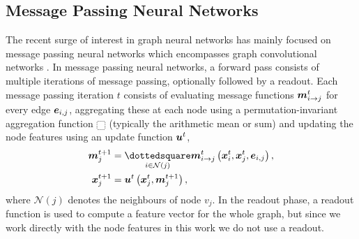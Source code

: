 \documentclass{article}
\begin{document}
\subsection{Message Passing Neural Networks}
The recent surge of interest in graph neural networks has mainly focused on message passing neural networks \citep{Gilmer2017} which encompasses graph convolutional networks \citep{Kipf2016}. In message passing neural networks, a forward pass consists of multiple iterations of message passing, optionally followed by a readout. Each message passing iteration $t$ consists of evaluating message functions ${\bm{m}}^t_{i\to j}$ for every edge ${\bm{e}}_{i,j}$, aggregating these at each node using a permutation-invariant aggregation function $\dottedsquare$ (typically the arithmetic mean or sum) and updating the node features using an update function ${\bm{u}}^t$,
\begin{align}
    \vm^{t+1}_j &= \underset{i\in\mathcal{N}(j)}{\dottedsquare} \vm^t_{i\to j}\left(\vx_i^t, \vx_j^t, \ve_{i,j} \right),\\
    \vx^{t+1}_j &= \vu^t\left(\vx^t_j, \vm^{t+1}_j\right),
\end{align}
where $\mathcal{N}(j)$ denotes the neighbours of node $v_j$. 
In the readout phase, a readout function is used to compute a feature vector for the whole graph, but since we work directly with the node features in this work we do not use a readout. 
\end{document}
